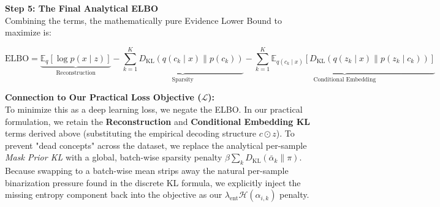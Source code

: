 \documentclass[11pt, a4paper]{article}
\begin{document}
\textbf{Step 5: The Final Analytical ELBO}\\
Combining the terms, the mathematically pure Evidence Lower Bound to maximize is:

\[
\text{ELBO} = \underbrace{\mathbb{E}_{q}[\log p(x \mid z)]}_{\text{Reconstruction}} - \underbrace{\sum_{k=1}^K D_{\mathrm{KL}}(q(c_k \mid x) \parallel p(c_k))}_{\text{Sparsity}} - \underbrace{\sum_{k=1}^K \mathbb{E}_{q(c_k \mid x)} \left[ D_{\mathrm{KL}}(q(z_k \mid x) \parallel p(z_k \mid c_k)) \right]}_{\text{Conditional Embedding}}
\]

\vspace{0.5cm}
\noindent \textbf{Connection to Our Practical Loss Objective ($\mathcal{L}$):}\\
To minimize this as a deep learning loss, we negate the ELBO. In our practical formulation, we retain the \textbf{Reconstruction} and \textbf{Conditional Embedding KL} terms derived above (substituting the empirical decoding structure $c \odot z$). To prevent "dead concepts" across the dataset, we replace the analytical per-sample \textit{Mask Prior KL} with a global, batch-wise sparsity penalty $\beta \sum_k D_{\mathrm{KL}}(\bar{\alpha}_k \parallel \pi)$. Because swapping to a batch-wise mean strips away the natural per-sample binarization pressure found in the discrete KL formula, we explicitly inject the missing entropy component back into the objective as our $\lambda_{\text{ent}} \mathcal{H}(\alpha_{i,k})$ penalty.
\end{document}
